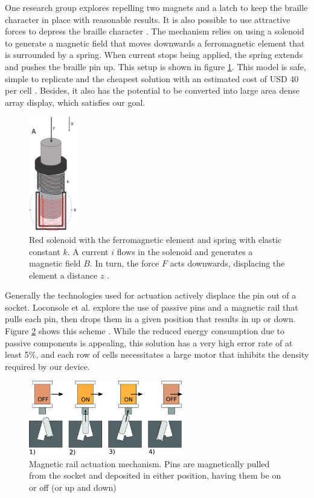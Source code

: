 One research group explores repelling two magnets and a latch to keep the braille character in place \cite{kim_braille_2020} with reasonable results.
It is also possible to use attractive forces to depress the braille character \cite{bettelani_design_2020}.
The mechanism relies on using a solenoid to generate a magnetic field that moves downwards a ferromagnetic element that is surrounded by a spring.
When current stops being applied, the spring extends and pushes the braille pin up.
This setup is shown in figure \ref{fig:magnetic-spring.png}.
This model is safe, simple to replicate and the cheapest solution with an estimated cost of USD 40 per cell \cite{bettelani_design_2020}.
Besides, it also has the potential to be converted into large area dense array display, which satisfies our goal. 

\begin{figure}[ht] \centering
    \includegraphics[height=5cm]{figures/magnetic-spring.png}
\caption[Linear magnetic actuation mechanism]{Red solenoid with the ferromagnetic element and spring with elastic constant $k$. A current $i$ flows in the solenoid and generates a magnetic field $B$. In turn, the force $F$ acts downwards, displacing the element a distance $z$ \cite{bettelani_design_2020}.}
\label{fig:magnetic-spring.png}
\end{figure}

Generally the technologies used for actuation actively displace the pin out of a socket.
Loconsole et al. explore the use of passive pins and a magnetic rail that pulls each pin, then drops them in a given position that results in up or down. Figure \ref{fig:magnetic-rail} shows this scheme \cite{loconsole_braillecursor_2019}.
While the reduced energy consumption due to passive components is appealing, this solution has a very high error rate of at least 5\%, and each row of cells necessitates a large motor that inhibits the density required by our device.
\begin{figure}[ht]
\centering
    \includegraphics[width=0.6\textwidth]{figures/magnetic-rail.jpg}
\caption[Magnetic rail actuation mechanism]{Magnetic rail actuation mechanism. Pins are magnetically pulled from the socket and deposited in either position, having them be on or off (or up and down)}
\label{fig:magnetic-rail}
\end{figure}  


